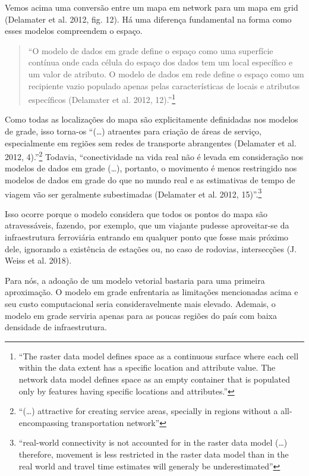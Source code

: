 \documentclass[]{article}
\let\rmarkdownfootnote\footnote%
\def\footnote{\protect\rmarkdownfootnote}
\begin{document}
Vemos acima uma conversão entre um mapa em network para um mapa em grid
(Delamater et al. 2012, fig. 12). Há uma diferença fundamental na forma
como esses modelos compreendem o espaço.

\begin{quote}
``O modelo de dados em grade define o espaço como uma superfície
contínua onde cada célula do espaço dos dados tem um local específico e
um valor de atributo. O modelo de dados em rede define o espaço como um
recipiente vazio populado apenas pelas características de locais e
atributos específicos (Delamater et al. 2012, 12).''\footnote{``The
  raster data model defines space as a continuous surface where each
  cell within the data extent has a specific location and attribute
  value. The network data model defines space as an empty container that
  is populated only by features having specific locations and
  attributes.''}
\end{quote}

Como todas as localizações do mapa são explicitamente definidadas nos
modelos de grade, isso torna-os ``(\ldots{}) atraentes para criação de
áreas de serviço, especialmente em regiões sem redes de transporte
abrangentes (Delamater et al. 2012, 4).''\footnote{``(\ldots{})
  attractive for creating service areas, specially in regions without a
  all-encompassing transportation network''} Todavia, ``conectividade na
vida real não é levada em consideração nos modelos de dados em grade
(\ldots{}), portanto, o movimento é menos restringido nos modelos de
dados em grade do que no mundo real e as estimativas de tempo de viagem
vão ser geralmente subestimadas (Delamater et al. 2012, 15)''.\footnote{``real-world
  connectivity is not accounted for in the raster data model (\ldots{})
  therefore, movement is less restricted in the raster data model than
  in the real world and travel time estimates will generaly be
  underestimated''}

Isso ocorre porque o modelo considera que todos os pontos do mapa são
atravessáveis, fazendo, por exemplo, que um viajante pudesse
aproveitar-se da infraestrutura ferroviária entrando em qualquer ponto
que fosse mais próximo dele, ignorando a existência de estações ou, no
caso de rodovias, intersecções (J. Weiss et al. 2018).

Para nós, a adoação de um modelo vetorial bastaria para uma primeira
aproximação. O modelo em grade enfrentaria as limitações mencionadas
acima e seu custo computacional seria consideravelmente mais elevado.
Ademais, o modelo em grade serviria apenas para as poucas regiões do
país com baixa densidade de infraestrutura.
\end{document}
